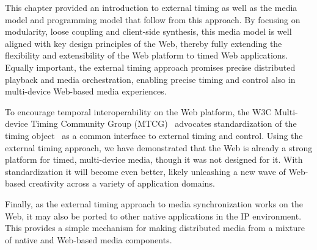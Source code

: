 \documentclass[graybox]{svmult}
\begin{document}
This chapter provided an introduction to external timing as well as the media
model and programming model that follow from this approach. By focusing
on modularity, loose coupling and client-side synthesis, this media model is
well aligned with key design principles of the Web, thereby fully extending
the flexibility and extensibility of the Web platform to timed Web
applications. Equally important, the external timing approach promises
precise distributed playback and media orchestration, enabling precise timing
and control also in multi-device Web-based media experiences.

To encourage temporal interoperability on the Web platform, the W3C Multi-
device Timing Community Group (MTCG)~\cite{mtcg} advocates standardization of
the timing object~\cite{timingobject} as a common interface to external timing
and control. Using the external timing approach, we have demonstrated that the
Web is already a strong platform for timed, multi-device media, though it was
not designed for it. With standardization it will become even better, likely
unleashing a new wave of Web-based creativity across a variety of application
domains.

Finally, as the external timing approach to media synchronization works on the
Web, it may also be ported to other native applications in the IP environment.
This provides a simple mechanism for making distributed media from a mixture
of native and Web-based media components.


\newpage

 
\end{document}
